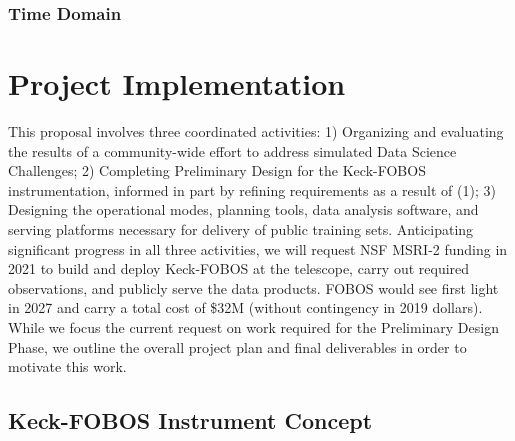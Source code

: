 \documentclass[oneside,11pt]{amsart}
\newcommand{\comment}[2][todo]{{\color{#1}[[{\bf #2}]]}}
\begin{document}


\subsubsection{Time Domain}
\label{sec:timedomain}
\noindent \comment{1/2 page}



\section{Project Implementation}
\label{sec:project}

This proposal involves three coordinated activities: 1) Organizing and evaluating the results of a community-wide
effort to address simulated Data Science Challenges; 2) Completing Preliminary Design for the Keck-FOBOS
instrumentation, informed in part by refining requirements as a result of (1); 3) Designing the operational modes,
planning tools, data analysis software, and serving platforms necessary for delivery of public training sets.
Anticipating significant progress in all three activities, we will request NSF MSRI-2 funding in 2021 to build and
deploy Keck-FOBOS at the telescope, carry out required observations, and publicly serve the data products.  FOBOS would
see first light in 2027 and carry a total cost of \$32M (without contingency in 2019 dollars).  While we focus the
current request on work required for the Preliminary Design Phase, we outline the overall project plan and final
deliverables in order to motivate this work.

\subsection{Keck-FOBOS Instrument Concept}
\label{sec:concept}
\end{document}
